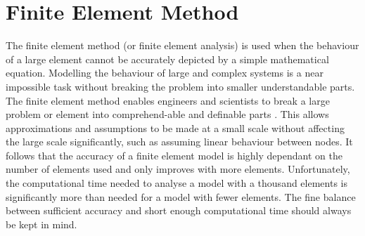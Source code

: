 \section{Finite Element Method}\label{femsec}
The finite element method  (or finite element analysis) is  used when the behaviour of a large element cannot be accurately depicted by a simple mathematical equation. 
Modelling the behaviour of large and complex systems is a near impossible task without breaking the problem into smaller understandable parts.
The finite element method enables engineers and scientists to break a large problem or element into comprehend-able and definable parts \citep{Zienkiewicz:2000}. 
This allows approximations and assumptions to be made at a small scale without affecting the large scale significantly, such as assuming linear behaviour between nodes. 
It follows that the accuracy of a finite element model is highly dependant on the number of elements used and only improves with more elements.
Unfortunately, the computational time needed to analyse a model with a thousand elements is significantly more than needed for a model with fewer elements.
The fine balance between sufficient accuracy and short enough computational time should always be kept in mind.


